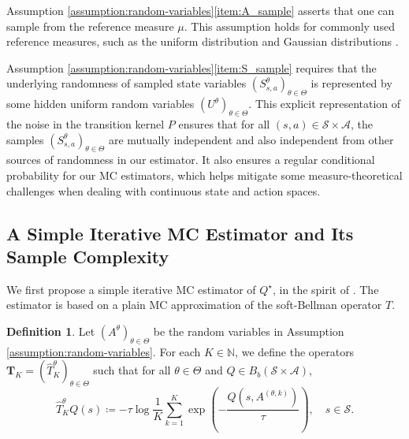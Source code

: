 \documentclass[11pt]{article}
\numberwithin{equation}{section}
\theoremstyle{definition}
\newtheorem{definition}{Definition}[section]
\theoremstyle{remark}
\def\cA{\mathcal{A}}
\def\cS{\mathcal{S}}
\def\N{{\mathbb{N}}}
\newcommand{\citep}{\cite}
\newcommand{\citet}{\cite}
\begin{document}
 
Assumption  \ref{assumption:random-variables}\ref{item:A_sample}
asserts that one can   sample  from 
the reference measure $\mu$.
This assumption holds    
  for commonly used reference measures,  such as the uniform distribution  \citep{mei2020global, reisinger2021regularity} and Gaussian distributions  
\citep{giegrich2024convergence}.

Assumption  \ref{assumption:random-variables}\ref{item:S_sample}
requires  
that 
the underlying randomness
of sampled state variables 
$(S^\theta_{s,a})_{\theta\in\Theta}$ is represented by some hidden uniform random variables 
$(U^\theta)_{\theta\in \Theta}$.
This   explicit
 representation of the noise in the transition kernel  $P$ ensures
 that for all $(s,a)\in \cS\times \cA$, the samples 
       $(S ^{\theta}_{s,a})_{\theta \in \Theta} $   
       are mutually independent and also independent    from other sources of randomness in our estimator. 
It also ensures a regular conditional probability for our MC estimators, which helps mitigate some measure-theoretical challenges when dealing with continuous state and action spaces.

 

\subsection{A Simple Iterative MC Estimator  and Its Sample Complexity} 
\label{sec:simple_MC}


  
We first propose  a simple iterative MC estimator of $Q^\star$, in the spirit of  \citet{kearns2002sparse}. 
The estimator is based on a plain  MC approximation  of the soft-Bellman operator $T$.

\begin{definition}
    \label{def:T-plain-monte-carlo}
    Let $(A ^{\theta})_{\theta \in \Theta}$ be the random variables  in Assumption \ref{assumption:random-variables}. For each $K \in \N$,
    we define the operators $\mathbf T_K =(\hat T^\theta_K)_{\theta\in \Theta}$ 
    such that for all  
    $\theta\in \Theta$ and 
    $Q \in B_b(\mathcal S \times \mathcal A)$, 
    \begin{equation}
        \label{eq:T-plain-monte-carlo}
        \hat{T} ^{\theta}_{K}Q(s) \coloneqq   -\tau \log \frac{1}{K}\sum_{k = 1}^{K} \exp \left(-\frac{Q(s,A^{(\theta,k)}) }{\tau}  \right),\quad s\in \cS.
    \end{equation}

\end{definition}
\end{document}
